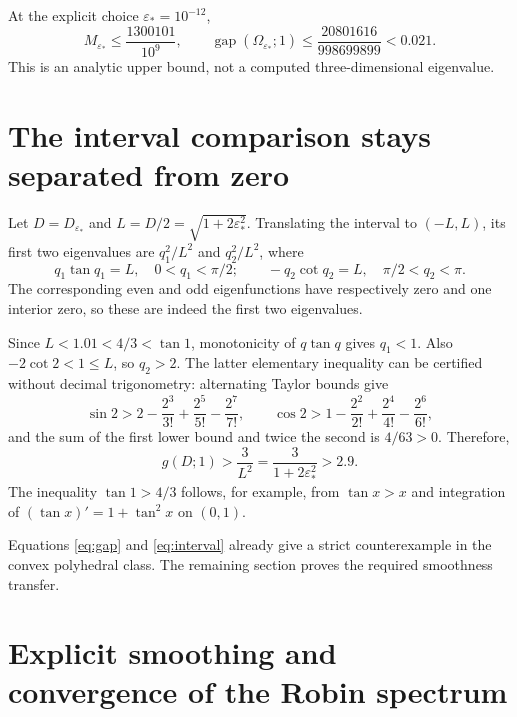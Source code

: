 \documentclass[11pt,a4paper]{article}
\theoremstyle{remark}
\newcommand{\eps}{\varepsilon}
\newcommand{\gap}{\operatorname{gap}}
\begin{document}
At the explicit choice $\eps_*=10^{-12}$,
\[
 M_{\eps_*}\le\frac{1300101}{10^9},\qquad
 \gap(\Omega_{\eps_*};1)
 \le\frac{20801616}{998699899}<0.021.
\]
This is an analytic upper bound, not a computed three-dimensional eigenvalue.

\section{The interval comparison stays separated from zero}
Let $D=D_{\eps_*}$ and $L=D/2=\sqrt{1+2\eps_*^2}$. Translating the interval to $(-L,L)$, its first two eigenvalues are $q_1^2/L^2$ and $q_2^2/L^2$, where
\[
 q_1\tan q_1=L,\quad 0<q_1<\pi/2;\qquad
 -q_2\cot q_2=L,\quad \pi/2<q_2<\pi.
\]
The corresponding even and odd eigenfunctions have respectively zero and one interior zero, so these are indeed the first two eigenvalues.

Since $L<1.01<4/3<\tan1$, monotonicity of $q\tan q$ gives $q_1<1$. Also $-2\cot2<1\le L$, so $q_2>2$. The latter elementary inequality can be certified without decimal trigonometry: alternating Taylor bounds give
\[
 \sin2>2-\frac{2^3}{3!}+\frac{2^5}{5!}-\frac{2^7}{7!},\qquad
 \cos2>1-\frac{2^2}{2!}+\frac{2^4}{4!}-\frac{2^6}{6!},
\]
and the sum of the first lower bound and twice the second is $4/63>0$. Therefore,
\begin{equation}\label{eq:interval}
 g(D;1)>\frac3{L^2}=\frac3{1+2\eps_*^2}>2.9.
\end{equation}
The inequality $\tan1>4/3$ follows, for example, from $\tan x>x$ and integration of $(\tan x)'=1+\tan^2x$ on $(0,1)$.

Equations \eqref{eq:gap} and \eqref{eq:interval} already give a strict counterexample in the convex polyhedral class. The remaining section proves the required smoothness transfer.

\section{Explicit smoothing and convergence of the Robin spectrum}
\end{document}
